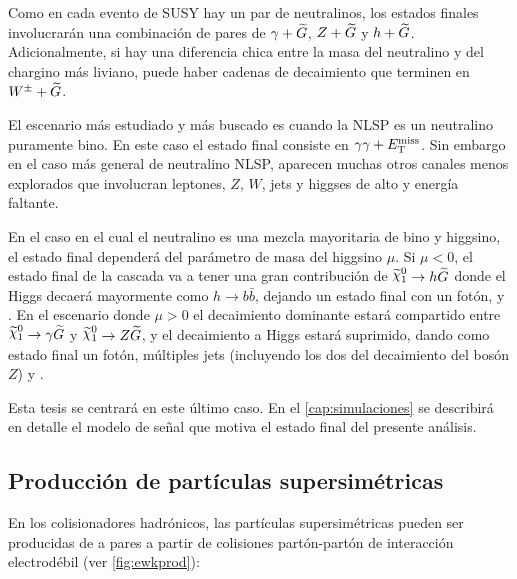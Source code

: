 Como en cada evento de SUSY hay un par de neutralinos, los estados finales
involucrarán una combinación de pares de $\gamma + \widetilde{G}$, $Z + \widetilde{G}$ y $h
+ \widetilde{G}$. Adicionalmente, si hay una diferencia chica entre la masa del
neutralino y del chargino más liviano, puede haber cadenas de decaimiento que
terminen en $W^\pm + \widetilde{G}$.

El escenario más estudiado y más buscado es cuando la NLSP es un neutralino
puramente bino. En este caso el estado final consiste en $\gamma\gamma + E_{\mathrm{T}}^{\mathrm{miss}}$. Sin
embargo en el caso más general de neutralino NLSP, aparecen muchas otros canales
menos explorados que involucran leptones, $Z$, $W$, jets y higgses de alto {\pt}
y energía faltante.


En el caso en el cual el neutralino es una mezcla mayoritaria de bino y
higgsino, el estado final dependerá del parámetro de masa del higgsino $\mu$. Si
$\mu <0$, el estado final de la cascada va a tener una gran contribución de
$\ninoone \to h\gravino$ donde el Higgs decaerá mayormente como $h\to b
\bar{b}$, dejando un estado final con un fotón, {\bjets} y {\met}. En el
escenario donde $\mu>0$ el decaimiento dominante estará compartido entre
$\ninoone \to \gam\gravino$ y $\ninoone\to Z \gravino$, y el decaimiento a Higgs
estará suprimido, dando como estado final un fotón, múltiples jets (incluyendo
los dos del decaimiento del bosón $Z$) y {\met}.

Esta tesis se centrará en este último caso. En el \cref{cap:simulaciones}
se describirá en detalle el modelo de se\~nal que motiva el estado final
del presente análisis.



\subsection{Producción de partículas supersimétricas}

En los colisionadores hadrónicos, las partículas supersimétricas pueden ser
producidas de a pares a partir de colisiones partón-partón de interacción
electrodébil (ver \cref{fig:ewkprod}):

